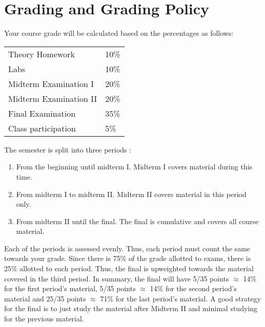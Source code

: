 \section*{Grading and Grading Policy}\label{sec:grading}

Your course grade will be calculated based on the percentages as follows: 

\begin{table}[h]
\centering
\begin{tabular}{l|l}
Theory Homework & 10\% \\
Labs & 10\% \\
Midterm Examination I & 20\%\\
Midterm Examination II & 20\%\\
Final Examination & 35\% \\
Class participation & 5\%
\end{tabular}
\end{table}
\FloatBarrier

The semester is split into three periods :

\begin{enumerate}
\item From the beginning until midterm I. Midterm I covers material during this time.
\item From midterm I to midterm II. Midterm II covers material in this period only. 
\item From midterm II until the final. The final is cumulative and covers all course material.
\end{enumerate}

Each of the periods is assessed evenly. Thus, each period must count the same towards your grade. Since there is 75\% of the grade allotted to exams, there is 25\% allotted to each period. Thus, the final is upweighted towards the material covered in the third period. In summary, the final will have 5/35 points $\approx$ 14\% for the first period's material, 5/35 points $\approx$ 14\% for the second period's material and 25/35 points $\approx$ 71\% for the last period's material. A good strategy for the final is to just study the material after Midterm II and minimal studying for the previous material.